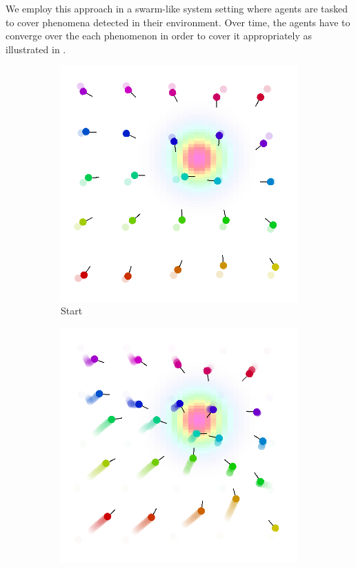 \documentclass[conference]{IEEEtran}
\begin{document}
We employ this approach in a swarm-like system setting where agents are tasked to cover phenomena detected in their environment. Over time, the agents have to converge over the each phenomenon in order to cover it appropriately as illustrated in .
\begin{figure}[t]
	\centering
	\begin{subfigure}[b]{0.32\linewidth}
		\includegraphics[width=\textwidth]{imgs/start.png}
		\caption{Start}
		\label{fig:initial}
	\end{subfigure}
	\begin{subfigure}[b]{0.32\linewidth}
		\includegraphics[width=\textwidth]{imgs/after.png}

\end{subfigure}
\end{figure}
\end{document}
